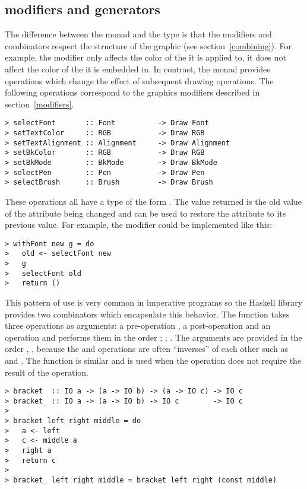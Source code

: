 \subsection{ modifiers and generators}\label{Draw modifiers}

The difference between the  monad and the 
type is that the  modifiers and combinators respect the
structure of the graphic (see section~\ref{combining}).  For example,
the  modifier only affects the color of the
 it is applied to, it does not affect the color of the
 it is embedded in.  In contrast, the  monad
provides operations which change the effect of subsequent drawing
operations.  The following operations correspond to the graphics
modifiers described in section~\ref{modifiers}.

\begin{verbatim}
> selectFont       :: Font          -> Draw Font  
> setTextColor     :: RGB           -> Draw RGB
> setTextAlignment :: Alignment     -> Draw Alignment
> setBkColor       :: RGB           -> Draw RGB
> setBkMode        :: BkMode        -> Draw BkMode
> selectPen        :: Pen           -> Draw Pen  
> selectBrush      :: Brush         -> Draw Brush
\end{verbatim}

These operations all have a type of the form .  The value returned is the old value of the attribute being
changed and can be used to restore the attribute to its previous
value.  For example, the  modifier could be implemented
like this:

\begin{verbatim}
> withFont new g = do
>   old <- selectFont new
>   g
>   selectFont old
>   return ()
\end{verbatim}

\begin{aside}
This pattern of use is very common in imperative programs so the
Haskell  library provides two combinators which encapsulate
this behavior.  The  function takes three operations as
arguments: a pre-operation , a post-operation 
and an operation  and performs them in the order
; ; .  The arguments are provided in
the order , ,  because the 
and  operations are often ``inverses'' of each other such
as  and .  The  function is
similar and is used when the  operation does not require
the result of the  operation.

\begin{verbatim}
> bracket  :: IO a -> (a -> IO b) -> (a -> IO c) -> IO c
> bracket_ :: IO a -> (a -> IO b) -> IO c        -> IO c
> 
> bracket left right middle = do
>   a <- left
>   c <- middle a
>   right a
>   return c
> 
> bracket_ left right middle = bracket left right (const middle)
\end{verbatim}
\end{aside}

